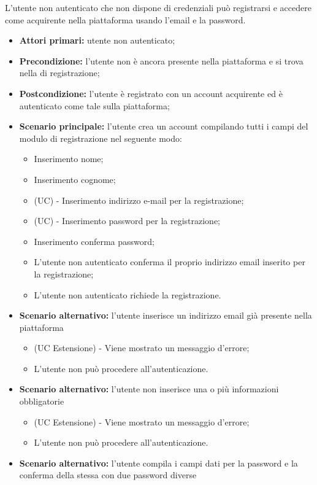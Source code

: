 L'utente non autenticato che non dispone di credenziali può registrarsi e accedere come acquirente nella piattaforma usando l'email e la password.
\begin{itemize}
    \item \textbf{Attori primari:} utente non autenticato;
    \item \textbf{Precondizione:} l'utente non è ancora presente nella piattaforma e si trova nella  di registrazione;
    \item \textbf{Postcondizione:} l'utente è registrato con un account acquirente ed è autenticato come tale sulla piattaforma;
    \item \textbf{Scenario principale:} l'utente crea un account compilando tutti i campi del modulo di registrazione nel seguente modo:
    \begin{itemize}
    	\item Inserimento nome;
    	\item Inserimento cognome;
        \item (UC) - Inserimento indirizzo e-mail per la registrazione;
        \item (UC) - Inserimento password per la registrazione;
        \item Inserimento conferma password;
        \item L'utente non autenticato conferma il proprio indirizzo email inserito per la registrazione;
        \item L'utente non autenticato richiede la registrazione.
    \end{itemize}
	\item \textbf{Scenario alternativo:} l'utente inserisce un indirizzo email già presente nella piattaforma
	\begin{itemize}
		\item (UC Estensione) - Viene mostrato un messaggio d'errore;
		\item L'utente non può procedere all'autenticazione.
	\end{itemize}
	\item \textbf{Scenario alternativo:} l'utente non inserisce una o più informazioni obbligatorie
	\begin{itemize}
		\item (UC Estensione) - Viene mostrato un messaggio d'errore;
		\item L'utente non può procedere all'autenticazione.
	\end{itemize}
	\item \textbf{Scenario alternativo:} l'utente compila i campi dati per la password e la conferma della stessa con due password diverse

\end{itemize}
